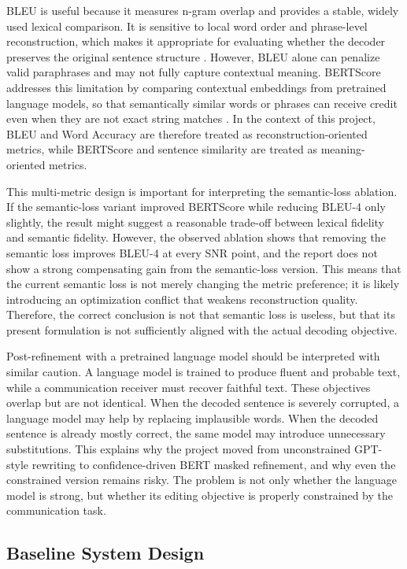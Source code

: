 BLEU is useful because it measures n-gram overlap and provides a stable, widely used lexical comparison. It is sensitive to local word order and phrase-level reconstruction, which makes it appropriate for evaluating whether the decoder preserves the original sentence structure \cite{papineni2002bleu}. However, BLEU alone can penalize valid paraphrases and may not fully capture contextual meaning. BERTScore addresses this limitation by comparing contextual embeddings from pretrained language models, so that semantically similar words or phrases can receive credit even when they are not exact string matches \cite{zhang2020bertscore}. In the context of this project, BLEU and Word Accuracy are therefore treated as reconstruction-oriented metrics, while BERTScore and sentence similarity are treated as meaning-oriented metrics.

This multi-metric design is important for interpreting the semantic-loss ablation. If the semantic-loss variant improved BERTScore while reducing BLEU-4 only slightly, the result might suggest a reasonable trade-off between lexical fidelity and semantic fidelity. However, the observed ablation shows that removing the semantic loss improves BLEU-4 at every SNR point, and the report does not show a strong compensating gain from the semantic-loss version. This means that the current semantic loss is not merely changing the metric preference; it is likely introducing an optimization conflict that weakens reconstruction quality. Therefore, the correct conclusion is not that semantic loss is useless, but that its present formulation is not sufficiently aligned with the actual decoding objective.

Post-refinement with a pretrained language model should be interpreted with similar caution. A language model is trained to produce fluent and probable text, while a communication receiver must recover faithful text. These objectives overlap but are not identical. When the decoded sentence is severely corrupted, a language model may help by replacing implausible words. When the decoded sentence is already mostly correct, the same model may introduce unnecessary substitutions. This explains why the project moved from unconstrained GPT-style rewriting to confidence-driven BERT masked refinement, and why even the constrained version remains risky. The problem is not only whether the language model is strong, but whether its editing objective is properly constrained by the communication task.

\subsection{Baseline System Design}

